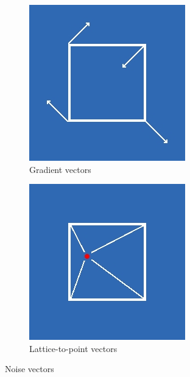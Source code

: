 		\begin{figure}[h]
			\begin{subfigure}{0.5\textwidth}
				\centering
				\includegraphics[width=0.9\linewidth]{"Images/gradient_vectors"}
				\caption{Gradient vectors}
				\label{fig:gradient_vectors}
			\end{subfigure}
			\begin{subfigure}{0.5\textwidth}
				\centering
				\includegraphics[width=0.9\linewidth]{"Images/vectors"}
				\caption{Lattice-to-point vectors}
				\label{fig:lattice-vectors}
			\end{subfigure}
			\caption{Noise vectors}
			\label{fig:noise_vectors}
		\end{figure}
		

